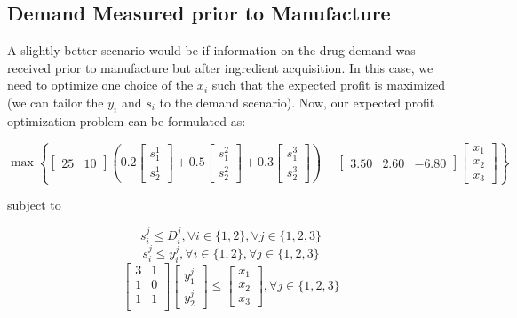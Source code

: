 \documentclass[a4paper]{article}
\begin{document}
\subsection{Demand Measured prior to Manufacture}
A slightly better scenario would be if information on the drug demand was received prior to manufacture but after ingredient acquisition.
In this case, we need to optimize one choice of the $x_i$ such that the expected profit is maximized (we can tailor the $y_i$ and $s_i$ to the demand scenario).
Now, our expected profit optimization problem can be formulated as:

\begin{equation}
\max \left \{ [\begin{matrix}25 & 10\end{matrix}]
\left( 0.2 \left [\begin{matrix}s_1^1 \\ s_2^1 \end{matrix} \right ] + 0.5 \left [\begin{matrix}s_1^2 \\ s_2^2 \end{matrix} \right ] + 0.3 \left [\begin{matrix}s_1^3 \\ s_2^3 \end{matrix} \right ] \right)
-[\begin{matrix}3.50 & 2.60 & -6.80\end{matrix}] \left [\begin{matrix}x_1 \\ x_2 \\ x_3 \end{matrix} \right ]
\right \}
\end{equation}

subject to

\begin{equation}
s_i^j \leq D_i^j , \forall i \in \{1,2\} , \forall j \in \{1,2,3\}
\end{equation}
\begin{equation}
s_i^j \leq y_i^j, \forall i \in \{1,2\} , \forall j \in \{1,2,3\}
\end{equation}
\begin{equation}
\left[
\begin{matrix}
3 & 1 \\
1 & 0 \\
1 & 1 \\
\end{matrix}
\right]
\left[\begin{matrix}y_1^j \\ y_2^j\end{matrix}\right]
\leq
\left[\begin{matrix}x_1 \\ x_2 \\ x_3 \end{matrix}\right]
, \forall j \in \{1,2,3\}
\end{equation}
\end{document}
